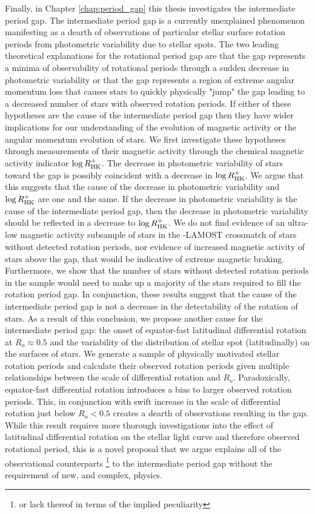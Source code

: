 Finally, in Chapter \ref{chap:period_gap} this thesis investigates the intermediate period gap.
The intermediate period gap is a currently unexplained phenomenon manifesting as a dearth of observations of particular stellar surface rotation periods from photometric variability due to stellar spots.
The two leading theoretical explanations for the rotational period gap are that the gap represents a minima of observability of rotational periods through a sudden decrease in photometric variability or that the gap represents a region of extreme angular momentum loss that causes stars to quickly physically "jump" the gap leading to a decreased number of stars with observed rotation periods.
If either of these hypotheses are the cause of the intermediate period gap then they have wider implications for our understanding of the evolution of magnetic activity or the angular momentum evolution of stars.
We first investigate these hypotheses through measurements of their magnetic activity through the chemical magnetic activity indicator $\log R^{+}_{\rm{HK}}$.
The decrease in photometric variability of stars toward the gap is possibly coincident with a decrease in $\log R^{+}_{\rm{HK}}$.
We argue that this suggests that the cause of the decrease in photometric variability and $\log R^{+}_{\rm{HK}}$ are one and the same.
If the decrease in photometric variability is the cause of the intermediate period gap, then the decrease in photometric variability should be reflected in a decrease to $\log R^{+}_{\rm{HK}}$.
We do not find evidence of an ultra-low magnetic activity subsample of stars in the \kepler-LAMOST crossmatch of stars without detected rotation periods, nor evidence of increased magnetic activity of stars above the gap, that would be indicative of extreme magnetic braking.
Furthermore, we show that the number of stars without detected rotation periods in the \kepler sample would need to make up a majority of the stars required to fill the rotation period gap.
In conjunction, these results suggest that the cause of the intermediate period gap is not a decrease in the detectability of the rotation of stars.
As a result of this conclusion, we propose another cause for the intermediate period gap: the onset of equator-fast latitudinal differential rotation at $R_o \approx 0.5$ and the variability of the distribution of stellar spot (latitudinally) on the surfaces of stars.
We generate a sample of physically motivated stellar rotation periods and calculate their observed rotation periods given multiple relationships between the scale of differential rotation and $R_o$.
Paradoxically, equator-fast differential rotation introduces a bias to larger observed rotation periods.
This, in conjunction with swift increase in the scale of differential rotation just below $R_o<0.5$ creates a dearth of observations resulting in the gap.
While this result requires more thorough investigations into the effect of latitudinal differential rotation on the stellar light curve and therefore observed rotational period, this is a novel proposal that we argue explains all of the observational counterparts \footnote{or lack thereof in terms of the implied peculiarity} to the intermediate period gap without the requirement of new, and complex, physics.

